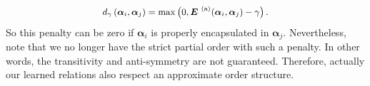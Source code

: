 \documentclass{article}
\newcommand{\Ev}[0]{\ensuremath{\boldsymbol{E}} }
\newcommand{\cdotv}[0]{\ensuremath{\boldsymbol{\cdot}}}
\begin{document}
\begin{equation}\label{eq:distance}
\small
\begin{split}
{d_\gamma }\left( {\bm{\alpha}_i,\bm{\alpha}_j} \right) = \max \left( {0,{\mbox{\Ev} ^{\text{(a)}}({\bm{\alpha}_i},{\bm{\alpha} _j})  - \gamma}} \right).
\end{split}
\end{equation}
So this penalty can be zero if $\bm{\alpha}_i$ is properly encapsulated in $\bm{\alpha}_j$. Nevertheless, note that we no longer have the strict partial order with such a penalty. In other words, the transitivity and anti-symmetry are not guaranteed. Therefore, actually our learned relations also respect an approximate order structure. 





\end{document}
